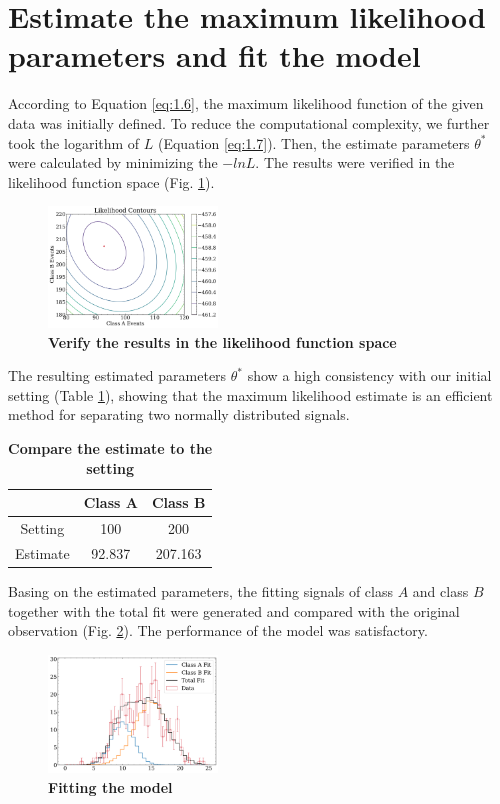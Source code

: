 \documentclass[10pt,a4paper,twocolumn,twoside,UTF8]{article}
\begin{document}
	\section{Estimate the maximum likelihood parameters and fit the model}
		According to Equation \ref{eq:1.6}, the maximum likelihood function of the given data was initially defined. 
		To reduce the computational complexity, we further took the logarithm of $L$ (Equation \ref{eq:1.7}). 
		Then, the estimate parameters $\theta^*$ were calculated by minimizing the $-lnL$. 
		The results were verified in the likelihood function space (Fig. \ref{fig:2.1}). 
		\begin{figure}[htbp]
			\centering
			\includegraphics[width=0.4\textwidth]{attachments/fig.2.1.png}
			\caption{\textbf{Verify the results in the likelihood function space}}
			\label{fig:2.1}
		\end{figure}
	
		The resulting estimated parameters $\theta^*$ show a high consistency with our initial setting (Table \ref{tab:2.1}), 
		showing that the maximum likelihood estimate is an efficient method for separating two normally distributed signals.
		\begin{table}[htbp]
			\centering
				\begin{tabular}{ccc}
					\toprule
						        &Class A	&Class B    \\
					\midrule
					Setting	    &100	    &200	    \\
					Estimate	&92.837	    &207.163	\\
					\bottomrule
				\end{tabular}
				\caption{\textbf{Compare the estimate to the setting}}
				\label{tab:2.1}
		\end{table}

		Basing on the estimated parameters, the fitting signals of class $A$ and class $B$ together with the total fit 
		were generated and compared with the original observation (Fig. \ref{fig:2.3}). The performance of the model was satisfactory.
		\begin{figure}[htbp]
			\centering
			\includegraphics[width=0.4\textwidth]{attachments/fig.2.3.png}
			\caption{\textbf{Fitting the model}}
			\label{fig:2.3}
		\end{figure}
\end{document}
